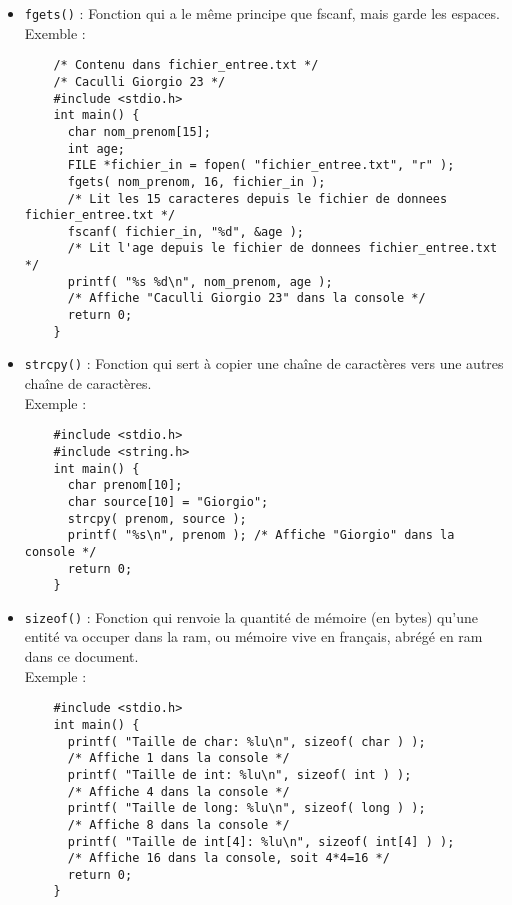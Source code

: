 \documentclass[10pt]{article}
\begin{document}
\begin{itemize}
\item \texttt{fgets()} : Fonction qui a le même principe que fscanf, mais garde les espaces.\\
  Exemble :
  \begin{lstlisting}
    /* Contenu dans fichier_entree.txt */
    /* Caculli Giorgio 23 */
    #include <stdio.h>
    int main() {
      char nom_prenom[15];
      int age;
      FILE *fichier_in = fopen( "fichier_entree.txt", "r" );
      fgets( nom_prenom, 16, fichier_in );
      /* Lit les 15 caracteres depuis le fichier de donnees fichier_entree.txt */
      fscanf( fichier_in, "%d", &age );
      /* Lit l'age depuis le fichier de donnees fichier_entree.txt */
      printf( "%s %d\n", nom_prenom, age );
      /* Affiche "Caculli Giorgio 23" dans la console */
      return 0;
    }
  \end{lstlisting}
  
\item \texttt{strcpy()} : Fonction qui sert à copier une chaîne de caractères vers une autres chaîne de caractères.\\
  Exemple :
  \begin{lstlisting}
    #include <stdio.h>
    #include <string.h>
    int main() {
      char prenom[10];
      char source[10] = "Giorgio";
      strcpy( prenom, source );
      printf( "%s\n", prenom ); /* Affiche "Giorgio" dans la console */
      return 0;
    }
  \end{lstlisting}
  
\item \texttt{sizeof()} : Fonction qui renvoie la quantité de mémoire (en bytes) qu'une entité va occuper dans la \acrlong{ram}, ou mémoire vive en français, abrégé en \acrshort{ram} dans ce document.\\
  Exemple :
  \begin{lstlisting}
    #include <stdio.h>
    int main() {
      printf( "Taille de char: %lu\n", sizeof( char ) );
      /* Affiche 1 dans la console */
      printf( "Taille de int: %lu\n", sizeof( int ) );
      /* Affiche 4 dans la console */
      printf( "Taille de long: %lu\n", sizeof( long ) );
      /* Affiche 8 dans la console */
      printf( "Taille de int[4]: %lu\n", sizeof( int[4] ) );
      /* Affiche 16 dans la console, soit 4*4=16 */
      return 0;
    }
  \end{lstlisting}


\end{itemize}
\end{document}
